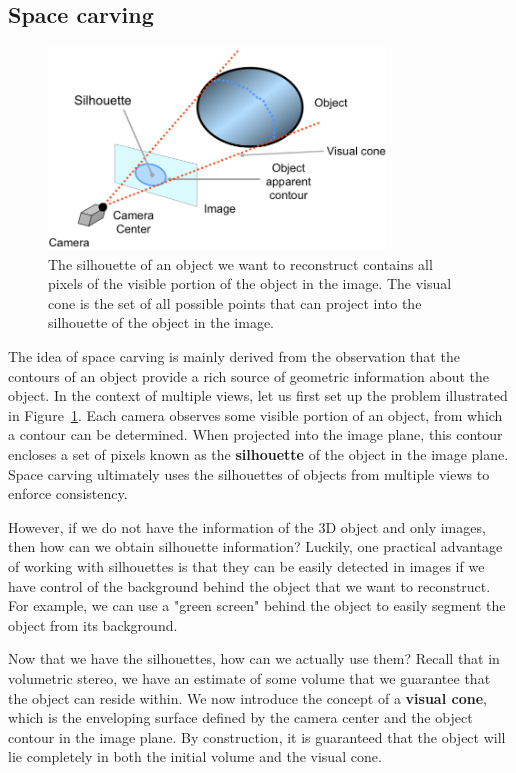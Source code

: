 \documentclass[a4paper, 12pt]{article}
\renewcommand\emph{\textbf}
\numberwithin{equation}{section}
\begin{document}
\subsection{Space carving}
\begin{figure}[h!]
    \centering
    \includegraphics[width = 0.8\textwidth]{figures/visual_cone.png}
    \caption{The silhouette of an object we want to reconstruct contains all pixels of the visible portion of the object in the image. The visual cone is the set of all possible points that can project into the silhouette of the object in the image.}
    \label{fig:visual_cone}
\end{figure}
The idea of space carving is mainly derived from the observation that the contours of an object provide a rich source of geometric information about the object. In the context of multiple views, let us first set up the problem illustrated in Figure~\ref{fig:visual_cone}. Each camera observes some visible portion of an object, from which a contour can be determined. When projected into the image plane, this contour encloses a set of pixels known as the \emph{silhouette} of the object in the image plane. Space carving ultimately uses the silhouettes of objects from multiple views to enforce consistency.

However, if we do not have the information of the 3D object and only images, then how can we obtain silhouette information? Luckily, one practical advantage of working with silhouettes is that they can be easily detected in images if we have control of the background behind the object that we want to reconstruct. For example, we can use a "green screen" behind the object to easily segment the object from its background.

Now that we have the silhouettes, how can we actually use them? Recall that in volumetric stereo, we have an estimate of some volume that we guarantee that the object can reside within. We now introduce the concept of a \emph{visual cone}, which is the enveloping surface defined by the camera center and the object contour in the image plane. By construction, it is guaranteed that the object will lie completely in both the initial volume and the visual cone. 
\end{document}
